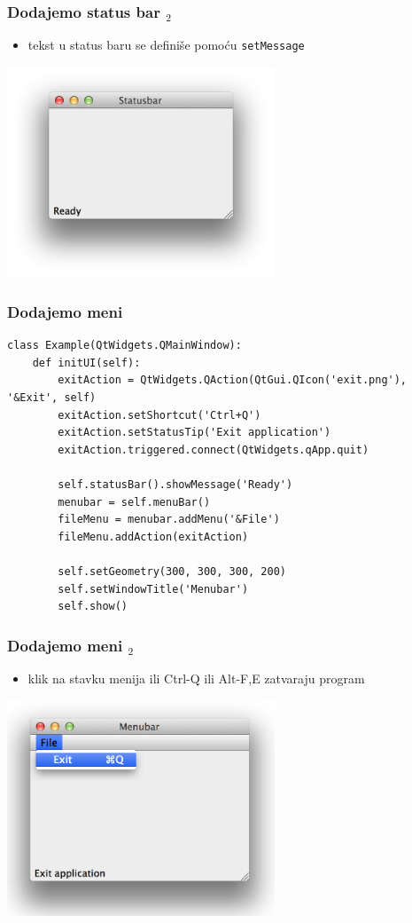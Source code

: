 \documentclass[utf8,compress]{beamer}
\begin{document}
\begin{frame}[fragile]
  \frametitle{Dodajemo status bar $_2$}
  \begin{itemize}
    \item tekst u status baru se definiše pomoću \texttt{setMessage}
  \end{itemize}
  \begin{center}
    \includegraphics[width=8cm]{pyqt02.png}
  \end{center}
\end{frame}


\begin{frame}[fragile]
  \frametitle{Dodajemo meni}
\begin{verbatim}
class Example(QtWidgets.QMainWindow):
    def initUI(self):                       
        exitAction = QtWidgets.QAction(QtGui.QIcon('exit.png'), '&Exit', self)        
        exitAction.setShortcut('Ctrl+Q')
        exitAction.setStatusTip('Exit application')
        exitAction.triggered.connect(QtWidgets.qApp.quit)

        self.statusBar().showMessage('Ready')
        menubar = self.menuBar()
        fileMenu = menubar.addMenu('&File')
        fileMenu.addAction(exitAction)
        
        self.setGeometry(300, 300, 300, 200)
        self.setWindowTitle('Menubar')    
        self.show()
\end{verbatim}
\end{frame}

\begin{frame}[fragile]
  \frametitle{Dodajemo meni $_2$}
  \begin{itemize}
    \item klik na stavku menija ili Ctrl-Q ili Alt-F,E zatvaraju program
  \end{itemize}
  \begin{center}
    \includegraphics[width=8cm]{pyqt03.png}
  \end{center}
\end{frame}
\end{document}
